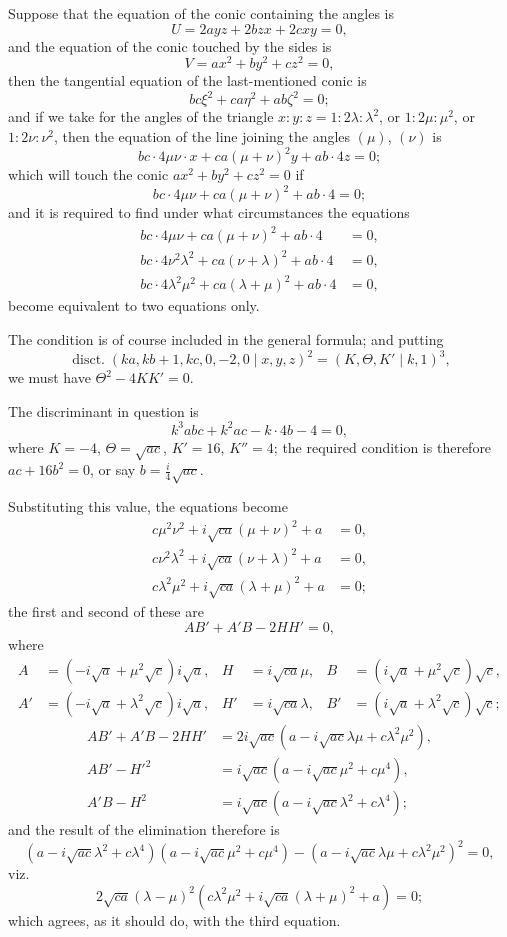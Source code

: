 \documentclass[11pt,a4paper]{article}
\theoremstyle{plain}
\begin{document}
Suppose that the equation of the conic containing the angles is
\[
U = 2ayz + 2bzx + 2cxy = 0,
\]
and the equation of the conic touched by the sides is
\[
V = ax^2 + by^2 + cz^2 = 0,
\]
then the tangential equation of the last-mentioned conic is
\[
bc\xi^2 + ca\eta^2 + ab\zeta^2 = 0;
\]
and if we take for the angles of the triangle $x:y:z = 1:2\lambda:\lambda^2$, or $1:2\mu:\mu^2$, or $1:2\nu:\nu^2$, then the equation of the line joining the angles $(\mu)$, $(\nu)$ is
\[
bc \cdot 4\mu\nu \cdot x + ca(\mu+\nu)^2 y + ab \cdot 4z = 0;
\]
which will touch the conic $ax^2 + by^2 + cz^2 = 0$ if
\[
bc \cdot 4\mu\nu + ca(\mu+\nu)^2 + ab \cdot 4 = 0;
\]
and it is required to find under what circumstances the equations
\begin{align*}
bc \cdot 4\mu\nu + ca(\mu+\nu)^2 + ab \cdot 4 &= 0, \\
bc \cdot 4\nu^2\lambda^2 + ca(\nu+\lambda)^2 + ab \cdot 4 &= 0, \\
bc \cdot 4\lambda^2\mu^2 + ca(\lambda+\mu)^2 + ab \cdot 4 &= 0,
\end{align*}
become equivalent to two equations only.

The condition is of course included in the general formula; and putting
\[
\operatorname{disct.} (ka, kb+1, kc, 0, -2, 0 \mid x,y,z)^2 = (K, \Theta, K' \mid k, 1)^3,
\]
we must have $\Theta^2 - 4KK' = 0$.

The discriminant in question is
\[
k^3 abc + k^2 ac - k \cdot 4b - 4 = 0,
\]
where $K = -4$, $\Theta = \sqrt{ac}$, $K' = 16$, $K'' = 4$; the required condition is therefore $ac + 16b^2 = 0$, or say $b = \frac{i}{4}\sqrt{ac}$.

Substituting this value, the equations become
\begin{align*}
c\mu^2\nu^2 + i\sqrt{ca}(\mu+\nu)^2 + a &= 0, \\
c\nu^2\lambda^2 + i\sqrt{ca}(\nu+\lambda)^2 + a &= 0, \\
c\lambda^2\mu^2 + i\sqrt{ca}(\lambda+\mu)^2 + a &= 0;
\end{align*}
the first and second of these are
\[
AB' + A'B - 2HH' = 0,
\]
where
\begin{align*}
A &= (-i\sqrt{a} + \mu^2\sqrt{c})i\sqrt{a}, & H &= i\sqrt{ca}\mu, & B &= (i\sqrt{a} + \mu^2\sqrt{c})\sqrt{c}, \\
A' &= (-i\sqrt{a} + \lambda^2\sqrt{c})i\sqrt{a}, & H' &= i\sqrt{ca}\lambda, & B' &= (i\sqrt{a} + \lambda^2\sqrt{c})\sqrt{c};
\end{align*}
\begin{align*}
AB' + A'B - 2HH' &= 2i\sqrt{ac}(a - i\sqrt{ac}\lambda\mu + c\lambda^2\mu^2), \\
AB' - H'^2 &= i\sqrt{ac}(a - i\sqrt{ac}\mu^2 + c\mu^4), \\
A'B - H^2 &= i\sqrt{ac}(a - i\sqrt{ac}\lambda^2 + c\lambda^4);
\end{align*}
and the result of the elimination therefore is
\[
(a - i\sqrt{ac}\lambda^2 + c\lambda^4)(a - i\sqrt{ac}\mu^2 + c\mu^4) - (a - i\sqrt{ac}\lambda\mu + c\lambda^2\mu^2)^2 = 0,
\]
viz.
\[
2\sqrt{ca}(\lambda - \mu)^2(c\lambda^2\mu^2 + i\sqrt{ca}(\lambda+\mu)^2 + a) = 0;
\]
which agrees, as it should do, with the third equation.
\end{document}
